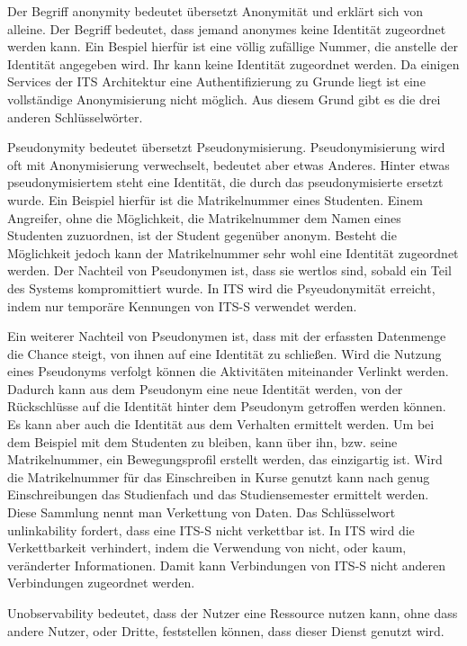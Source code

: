 Der Begriff anonymity bedeutet übersetzt Anonymität und erklärt sich von alleine. Der Begriff bedeutet, dass jemand anonymes keine Identität zugeordnet werden kann. Ein Bespiel hierfür ist eine völlig zufällige Nummer, die anstelle der Identität angegeben wird. Ihr kann keine Identität zugeordnet werden. Da einigen Services der \ac{ITS} Architektur eine Authentifizierung zu Grunde liegt ist eine vollständige Anonymisierung nicht möglich. Aus diesem Grund gibt es die drei anderen Schlüsselwörter. 

Pseudonymity bedeutet übersetzt Pseudonymisierung.  Pseudonymisierung wird oft mit Anonymisierung verwechselt, bedeutet aber etwas Anderes. Hinter etwas pseudonymisiertem steht eine Identität, die durch das  pseudonymisierte ersetzt wurde. Ein Beispiel hierfür ist die Matrikelnummer eines Studenten. Einem Angreifer, ohne die Möglichkeit, die Matrikelnummer dem Namen eines Studenten zuzuordnen, ist der Student gegenüber anonym. Besteht die Möglichkeit jedoch kann der Matrikelnummer sehr wohl eine Identität zugeordnet werden. Der Nachteil von Pseudonymen ist, dass sie wertlos sind, sobald ein Teil des Systems kompromittiert wurde. In \ac{ITS} wird die  Psyeudonymität erreicht, indem nur temporäre Kennungen von \ac{ITS-S} verwendet werden.

Ein weiterer Nachteil von Pseudonymen ist, dass mit der erfassten Datenmenge die Chance steigt, von ihnen auf eine Identität zu schließen. Wird die Nutzung eines Pseudonyms verfolgt können die Aktivitäten miteinander Verlinkt werden. Dadurch kann aus dem Pseudonym eine neue Identität werden, von der Rückschlüsse auf die Identität hinter dem Pseudonym getroffen werden können. Es kann aber auch die Identität aus dem Verhalten ermittelt werden. Um bei dem Beispiel mit dem Studenten zu bleiben, kann über ihn, bzw. seine Matrikelnummer, ein Bewegungsprofil erstellt werden, das  einzigartig ist. Wird die Matrikelnummer für das Einschreiben in Kurse genutzt kann nach genug Einschreibungen das Studienfach und das Studiensemester ermittelt werden. Diese Sammlung nennt man Verkettung von Daten. Das Schlüsselwort unlinkability fordert, dass eine \ac{ITS-S} nicht verkettbar ist. In \ac{ITS} wird die Verkettbarkeit verhindert, indem die Verwendung von nicht, oder kaum, veränderter Informationen. Damit kann Verbindungen von \ac{ITS-S} nicht anderen Verbindungen zugeordnet werden.

Unobservability bedeutet, dass der Nutzer eine Ressource nutzen kann, ohne dass andere Nutzer, oder Dritte, feststellen können, dass dieser Dienst genutzt wird.


